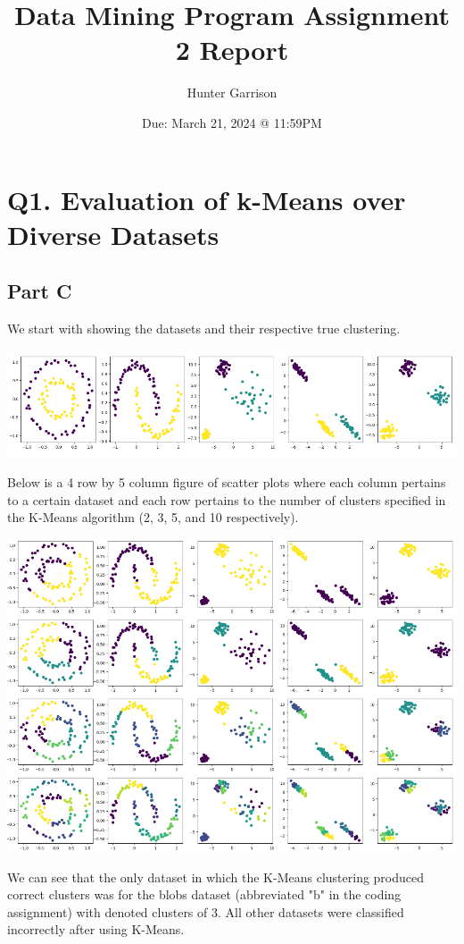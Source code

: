 \documentclass{article}
\title{Data Mining Program Assignment 2 Report}
\author{Hunter Garrison}
\date{Due: March 21, 2024 @ 11:59PM}
\begin{document}
\maketitle  %

\section*{Q1. Evaluation of k-Means over Diverse Datasets}

\subsection*{Part C}
We start with showing the datasets and their respective true clustering.

\includegraphics[width=\linewidth]{Images/Screenshot 2024-03-04 174741.png}

Below is a 4 row by 5 column figure of scatter plots where each column pertains to a certain dataset and 
each row pertains to the number of clusters specified in the K-Means algorithm (2, 3, 5, and 10 
respectively).

\includegraphics[width=\linewidth]{Images/Screenshot 2024-03-04 175109.png}

We can see that the only dataset in which the K-Means clustering produced correct clusters was for the 
blobs dataset (abbreviated "b" in the coding assignment) with denoted clusters of 3. All other datasets were 
classified incorrectly after using K-Means.
\end{document}
